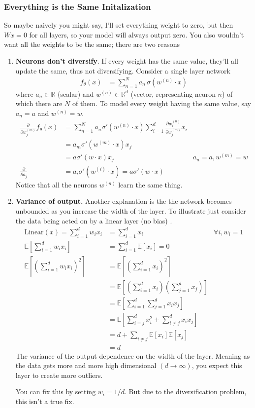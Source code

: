 \subsubsection{Everything is the Same Initalization}
So maybe naively you might say, I'll set everything weight to zero, but then $Wx = 0$ for all layers, so your model will always output zero. You also wouldn't want all the weights to be the same; there are two reasons
\begin{enumerate}
	\item \textbf{Neurons don't diversify}. If every weight has the same value, they'll all update the same, thus not diversifying. Consider a single layer network
	\begin{align}
		f_\theta(x) & = \sum_{n=1}^N a_n \, \sigma( w^{(n)} \cdot x )
	\end{align}
	where $a_n \in \mathbb R$ (scalar) and $w^{(n)} \in \mathbb R^d$ (vector, representing neuron $n$) of which there are $N$ of them. To model every weight having the same value, say $a_n = a$ and $w^{(n)} = w$.
	\begin{align}
		\frac{\partial}{\partial w_j^{(m)}} f_\theta(x) & = \sum_{n=1}^N a_n \sigma'(w^{(n)} \cdot x) \sum_{i=1}^d \frac{\partial w^{(n)}_i}{\partial w^{(m)}_j} x_i \\
		& = a_m \sigma'(w^{(m)} \cdot x) x_j\\
		& = a \sigma'(w \cdot x) x_j & a_n = a, w^{(m)} = w\\
		\frac{\partial}{\partial a_j} & = a_i \sigma' (w^{(i)} \cdot x) = a \sigma' (w \cdot x)
	\end{align}
	Notice that all the neurons $w^{(n)}$ learn the same thing. 
	\item \textbf{Variance of output.} Another explanation is the the network becomes unbounded as you increase the width of the layer. To illustrate just consider the data being acted on by a linear layer (no bias) .
	\begin{align}
	\text{Linear}(x) = \sum_{i=1}^d w_i x_i  &= \sum_{i=1}^d x_i  & \forall i , w_i = 1\\
	\mathbb E \left[ \sum_{i=1}^d w_i x_i  \right] & = \sum_{i=1}^d \mathbb E[x_i] =0\\
	\mathbb E \left[ \left(\sum_{i=1}^d w_i x_i \right)^2  \right] & = \mathbb E\left[\left(\sum_{i=1}^d x_i \right)^2   \right]\\
	& = \mathbb E\left[\left(\sum_{i=1}^d x_i \right)  \left(\sum_{j=1}^d x_j \right)  \right]\\
	& = \mathbb E \left[ \sum_{i=1}^d \sum_{j=1}^d x_i x_j\right]\\
	& =  \mathbb E\left[ \sum_{i=j}^d x_i^2 + \sum_{i \neq j}^d x_i x_j \right]\\
	& = d + \sum_{i \neq j} \mathbb E[x_i] \mathbb E[x_j] \\
	& = d 
\end{align}
The variance of the output dependence on the width of the layer. Meaning as the data gets more and more high dimensional $(d \to \infty)$, you expect this layer to create more outliers. 

You can fix this by setting $w_i = 1/d$. But due to the diversification problem, this isn't a true fix.
\end{enumerate}

